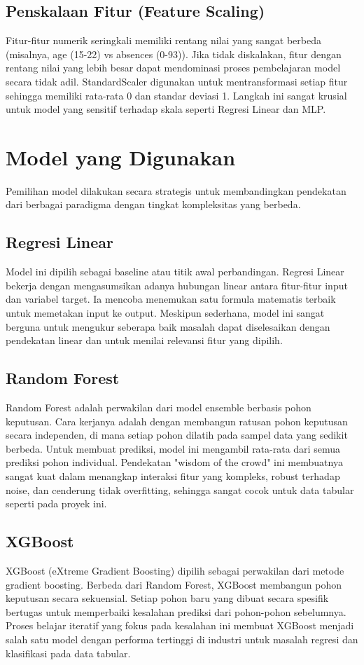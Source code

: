 \subsection{Penskalaan Fitur (Feature Scaling)}
Fitur-fitur numerik seringkali memiliki rentang nilai yang sangat berbeda (misalnya, age (15-22) vs absences (0-93)). Jika tidak diskalakan, fitur dengan rentang nilai yang lebih besar dapat mendominasi proses pembelajaran model secara tidak adil. StandardScaler digunakan untuk mentransformasi setiap fitur sehingga memiliki rata-rata 0 dan standar deviasi 1. Langkah ini sangat krusial untuk model yang sensitif terhadap skala seperti Regresi Linear dan MLP.

\section{Model yang Digunakan}
Pemilihan model dilakukan secara strategis untuk membandingkan pendekatan dari berbagai paradigma dengan tingkat kompleksitas yang berbeda.

\subsection{Regresi Linear}
Model ini dipilih sebagai baseline atau titik awal perbandingan. Regresi Linear bekerja dengan mengasumsikan adanya hubungan linear antara fitur-fitur input dan variabel target. Ia mencoba menemukan satu formula matematis terbaik untuk memetakan input ke output. Meskipun sederhana, model ini sangat berguna untuk mengukur seberapa baik masalah dapat diselesaikan dengan pendekatan linear dan untuk menilai relevansi fitur yang dipilih.

\subsection{Random Forest}
Random Forest adalah perwakilan dari model ensemble berbasis pohon keputusan. Cara kerjanya adalah dengan membangun ratusan pohon keputusan secara independen, di mana setiap pohon dilatih pada sampel data yang sedikit berbeda. Untuk membuat prediksi, model ini mengambil rata-rata dari semua prediksi pohon individual. Pendekatan "wisdom of the crowd" ini membuatnya sangat kuat dalam menangkap interaksi fitur yang kompleks, robust terhadap noise, dan cenderung tidak overfitting, sehingga sangat cocok untuk data tabular seperti pada proyek ini.

\subsection{XGBoost}
XGBoost (eXtreme Gradient Boosting) dipilih sebagai perwakilan dari metode gradient boosting. Berbeda dari Random Forest, XGBoost membangun pohon keputusan secara sekuensial. Setiap pohon baru yang dibuat secara spesifik bertugas untuk memperbaiki kesalahan prediksi dari pohon-pohon sebelumnya. Proses belajar iteratif yang fokus pada kesalahan ini membuat XGBoost menjadi salah satu model dengan performa tertinggi di industri untuk masalah regresi dan klasifikasi pada data tabular.

